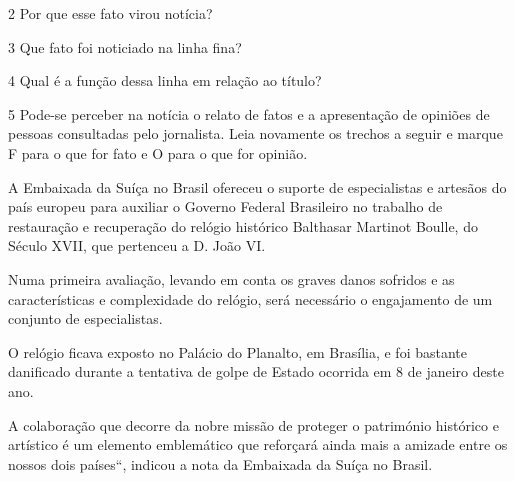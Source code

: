 \num{2} Por que esse fato virou notícia?


\num{3} Que fato foi noticiado na linha fina?


\num{4} Qual é a função dessa linha em relação ao título?


\num{5} Pode-se perceber na notícia o relato de fatos e a apresentação
de opiniões de pessoas consultadas pelo jornalista. Leia novamente os
trechos a seguir e marque F para o que for fato e O para o que for
opinião.


\begin{boxlist}
 A Embaixada da Suíça no Brasil ofereceu o suporte de especialistas
e artesãos do país europeu para auxiliar o Governo Federal Brasileiro no
trabalho de restauração e recuperação do relógio histórico Balthasar
Martinot Boulle, do Século XVII, que pertenceu a D. João VI.

 Numa primeira avaliação, levando em conta os graves danos sofridos
e as características e complexidade do relógio, será necessário o
engajamento de um conjunto de especialistas.

 O relógio ficava exposto no Palácio do Planalto, em Brasília, e
foi bastante danificado durante a tentativa de golpe de Estado ocorrida
em 8 de janeiro deste ano.

 A colaboração que decorre da nobre missão de proteger o património
histórico e artístico é um elemento emblemático que reforçará ainda mais
a amizade entre os nossos dois países``, indicou a nota da Embaixada da
Suíça no Brasil.
\end{boxlist}

